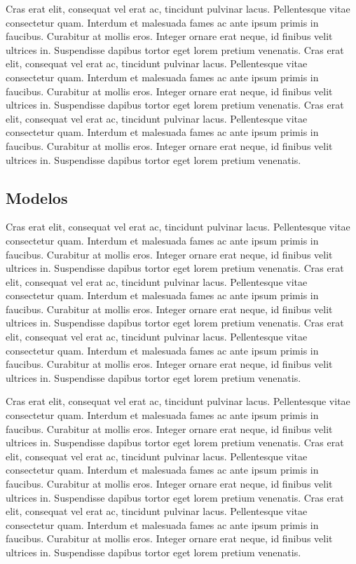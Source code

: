 \documentclass[./main.tex]{subfiles}
\begin{document}
\par Cras erat elit, consequat vel erat ac, tincidunt pulvinar lacus. Pellentesque vitae consectetur quam. Interdum et malesuada fames ac ante ipsum primis in faucibus. Curabitur at mollis eros. Integer ornare erat neque, id finibus velit ultrices in. Suspendisse dapibus tortor eget lorem pretium venenatis. Cras erat elit, consequat vel erat ac, tincidunt pulvinar lacus. Pellentesque vitae consectetur quam. Interdum et malesuada fames ac ante ipsum primis in faucibus. Curabitur at mollis eros. Integer ornare erat neque, id finibus velit ultrices in. Suspendisse dapibus tortor eget lorem pretium venenatis. Cras erat elit, consequat vel erat ac, tincidunt pulvinar lacus. Pellentesque vitae consectetur quam. Interdum et malesuada fames ac ante ipsum primis in faucibus. Curabitur at mollis eros. Integer ornare erat neque, id finibus velit ultrices in. Suspendisse dapibus tortor eget lorem pretium venenatis.


\subsection{Modelos }

\par Cras erat elit, consequat vel erat ac, tincidunt pulvinar lacus. Pellentesque vitae consectetur quam. Interdum et malesuada fames ac ante ipsum primis in faucibus. Curabitur at mollis eros. Integer ornare erat neque, id finibus velit ultrices in. Suspendisse dapibus tortor eget lorem pretium venenatis. Cras erat elit, consequat vel erat ac, tincidunt pulvinar lacus. Pellentesque vitae consectetur quam. Interdum et malesuada fames ac ante ipsum primis in faucibus. Curabitur at mollis eros. Integer ornare erat neque, id finibus velit ultrices in. Suspendisse dapibus tortor eget lorem pretium venenatis. Cras erat elit, consequat vel erat ac, tincidunt pulvinar lacus. Pellentesque vitae consectetur quam. Interdum et malesuada fames ac ante ipsum primis in faucibus. Curabitur at mollis eros. Integer ornare erat neque, id finibus velit ultrices in. Suspendisse dapibus tortor eget lorem pretium venenatis.

\par Cras erat elit, consequat vel erat ac, tincidunt pulvinar lacus. Pellentesque vitae consectetur quam. Interdum et malesuada fames ac ante ipsum primis in faucibus. Curabitur at mollis eros. Integer ornare erat neque, id finibus velit ultrices in. Suspendisse dapibus tortor eget lorem pretium venenatis. Cras erat elit, consequat vel erat ac, tincidunt pulvinar lacus. Pellentesque vitae consectetur quam. Interdum et malesuada fames ac ante ipsum primis in faucibus. Curabitur at mollis eros. Integer ornare erat neque, id finibus velit ultrices in. Suspendisse dapibus tortor eget lorem pretium venenatis. Cras erat elit, consequat vel erat ac, tincidunt pulvinar lacus. Pellentesque vitae consectetur quam. Interdum et malesuada fames ac ante ipsum primis in faucibus. Curabitur at mollis eros. Integer ornare erat neque, id finibus velit ultrices in. Suspendisse dapibus tortor eget lorem pretium venenatis.
\end{document}
